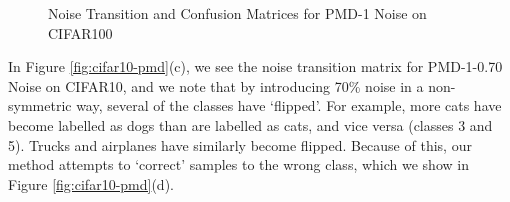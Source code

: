 \documentclass[10pt,twocolumn,letterpaper]{article}
\begin{document}
\begin{figure}[!ht]
    \begin{center}
    \end{center}
    \caption{Noise Transition and Confusion Matrices for PMD-1 Noise on CIFAR100}
    \label{fig:cifar100-pmd}
\end{figure}

In Figure \ref{fig:cifar10-pmd}(c), we see the noise transition matrix for PMD-1-0.70 Noise on CIFAR10, and we note that by introducing 70\% noise in a non-symmetric way, several of the classes have `flipped'. For example, more cats have become labelled as dogs than are labelled as cats, and vice versa (classes 3 and 5). Trucks and airplanes have similarly become flipped. Because of this, our method attempts to `correct' samples to the wrong class, which we show in Figure \ref{fig:cifar10-pmd}(d).
\end{document}
